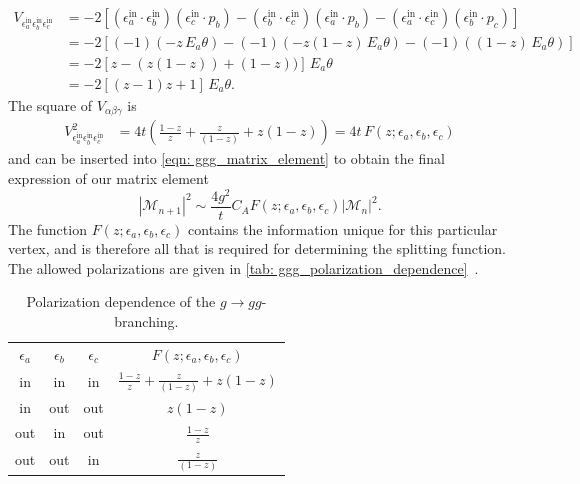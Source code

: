 \documentclass[main.tex]{subfiles}
\begin{document}
\begin{align}
    V_{\epsilon_a^\text{in} \epsilon_b^\text{in} \epsilon_c^\text{in}} &= -2 \left[
    (\epsilon_a^\text{in} \cdot \epsilon_b^\text{in})(\epsilon_c^\text{in} \cdot p_b) - 
    (\epsilon_b^\text{in} \cdot \epsilon_c^\text{in})(\epsilon_a^\text{in} \cdot p_b) -
    (\epsilon_a^\text{in} \cdot \epsilon_c^\text{in})(\epsilon_b^\text{in} \cdot p_c)
    \right] \nonumber\\
    &= -2 \left[
    (-1)(-z\,E_a\theta) - (-1)(-z(1-z)\,E_a\theta) - (-1)((1-z)\, E_a\theta) 
    \right] \nonumber \\
    &= -2 \left[ z - (z(1-z)) + (1-z) ) \right] \,E_a\theta \nonumber \\
    &= -2 \left[ (z-1)z+ 1 \right] \,E_a\theta.
\end{align}
The square of \(V_{\alpha\beta\gamma}\) is
\begin{align}
    V_{\epsilon_a^\text{in} \epsilon_b^\text{in} \epsilon_c^\text{in}}^2 &= 4 t 
    \left( \frac{1-z}{z} + \frac{z}{(1-z)} + z(1-z) \right) = 4t \, F(z;\epsilon_a,\epsilon_b,\epsilon_c)
\end{align}
and can be inserted into \autoref{eqn: ggg_matrix_element} to obtain the final expression of our matrix element
\begin{equation}\label{eqn: ggg_matrix_element_ellis_5.9}
    |\mathcal{M}_{n+1}|^2 \sim \frac{4g^2}{t} C_A F(z;\epsilon_a,\epsilon_b,\epsilon_c) |\mathcal{M}_n|^2.
\end{equation}
The function \(F(z;\epsilon_a,\epsilon_b,\epsilon_c)\) contains the information unique for this particular vertex, and is therefore all that is required for determining the splitting function. The allowed polarizations are given in \autoref{tab: ggg_polarization_dependence}~\cite{ellis_stirling_webber_1996}.
\begin{table}[htb]
    \centering
    \begin{tabular}[]{cccccc}
        \(\epsilon_a\) & \(\epsilon_b\) & \(\epsilon_c\)& \multicolumn{3}{c}{\(F(z;\epsilon_a,\epsilon_b,\epsilon_c)\)} \\
        \cmidrule(lr){1-3} \cmidrule(lr){4-6}
        in & in & in & \multicolumn{3}{c}{\(\frac{1-z}{z} + \frac{z}{(1-z)} + z(1-z)\)} \\[0.2cm]
        in & out & out & \multicolumn{3}{c}{\(z(1-z)\)} \\[0.2cm]
        out & in & out & \multicolumn{3}{c}{\(\frac{1-z}{z} \)} \\[0.2cm]
        out & out & in & \multicolumn{3}{c}{\(\frac{z}{(1-z)} \)} \\[0.2cm]
        \bottomrule
    \end{tabular}
    \caption{Polarization dependence of the \(g\rightarrow gg\)-branching.}
    \label{tab: ggg_polarization_dependence}
\end{table}
\end{document}
